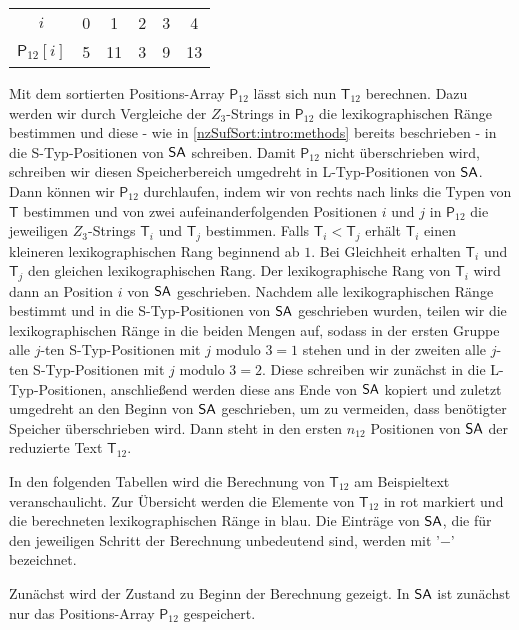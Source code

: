 \begin{table}[H]
	\footnotesize
	\centering
	\begin{tabular}{c| c c c c c }
		$i$ & 0 & 1 & 2 & 3 & 4 \\
		$\mathsf{P}_{12}[i]$ & 5 & 11 & 3 & 9 & 13 
	\end{tabular}
\end{table}

Mit dem sortierten Positions-Array $\mathsf{P}_{12}$ lässt sich nun $\mathsf{T}_{12}$ berechnen. Dazu werden wir durch Vergleiche der $Z_3$-Strings in $\mathsf{P}_{12}$ die lexikographischen Ränge bestimmen und diese - wie in \cref{nzSufSort:intro:methods} bereits beschrieben - in die S-Typ-Positionen von $\sa$ schreiben. Damit $\mathsf{P}_{12}$ nicht überschrieben wird, schreiben wir diesen Speicherbereich umgedreht in L-Typ-Positionen von $\sa$. Dann können wir $\mathsf{P}_{12}$ durchlaufen, indem wir von rechts nach links die Typen von $\mathsf{T}$ bestimmen und von zwei aufeinanderfolgenden Positionen $i$ und $j$ in $\mathsf{P}_{12}$ die jeweiligen $Z_3$-Strings $\mathsf{T}_i$ und $\mathsf{T}_j$ bestimmen. Falls $\mathsf{T}_i < \mathsf{T}_j$ erhält $\mathsf{T}_i$ einen kleineren lexikographischen Rang beginnend ab $1$. Bei Gleichheit erhalten $\mathsf{T}_i$ und $\mathsf{T}_j$ den gleichen lexikographischen Rang. Der lexikographische Rang von $\mathsf{T}_i$ wird dann an Position $i$ von $\sa$ geschrieben. Nachdem alle lexikographischen Ränge bestimmt und in die S-Typ-Positionen von $\sa$ geschrieben wurden, teilen wir die lexikographischen Ränge in die beiden Mengen auf, sodass in der ersten Gruppe alle $j$-ten S-Typ-Positionen mit $j \text{ modulo } 3 = 1$ stehen und in der zweiten alle $j$-ten S-Typ-Positionen mit $j \text{ modulo } 3 = 2$. Diese schreiben wir zunächst in die L-Typ-Positionen, anschließend werden diese ans Ende von $\sa$ kopiert und zuletzt umgedreht an den Beginn von $\sa$ geschrieben, um zu vermeiden, dass benötigter Speicher überschrieben wird. Dann steht in den ersten $n_{12}$ Positionen von $\sa$ der reduzierte Text $\mathsf{T}_{12}$. \par
In den folgenden Tabellen wird die Berechnung von $\mathsf{T}_{12}$ am Beispieltext veranschaulicht. Zur Übersicht werden die Elemente von $\mathsf{T}_{12}$ in rot markiert und die berechneten lexikographischen Ränge in blau. Die Einträge von $\sa$, die für den jeweiligen Schritt der Berechnung unbedeutend sind, werden mit '$-$' bezeichnet.\par
Zunächst wird der Zustand zu Beginn der Berechnung gezeigt. In $\sa$ ist zunächst nur das Positions-Array $\mathsf{P}_{12}$ gespeichert.

